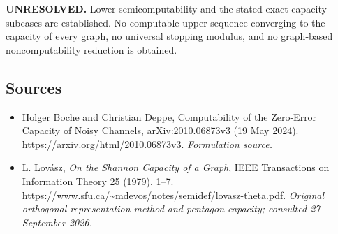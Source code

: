 \documentclass[11pt]{article}
\begin{document}
\textbf{UNRESOLVED.} Lower semicomputability and the stated exact capacity subcases are established. No computable upper sequence converging to the capacity of every graph, no universal stopping modulus, and no graph-based noncomputability reduction is obtained.

\subsection{Sources}
\begin{itemize}
\item[S1]Holger Boche and Christian Deppe, Computability of the Zero-Error Capacity of Noisy Channels, arXiv:2010.06873v3 (19 May 2024).
\url{https://arxiv.org/html/2010.06873v3}.
\textit{Formulation source.}
\item[E1]L. Lovász, \emph{On the Shannon Capacity of a Graph}, IEEE Transactions on Information Theory 25 (1979), 1--7.
\url{https://www.sfu.ca/~mdevos/notes/semidef/lovasz-theta.pdf}.
\textit{Original orthogonal-representation method and pentagon capacity; consulted 27 September 2026.}
\end{itemize}
\end{document}
